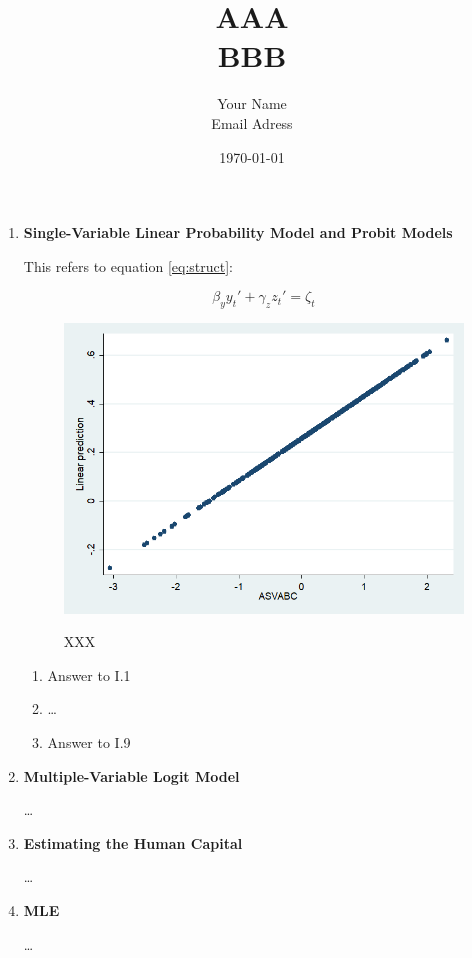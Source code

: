 \documentclass{article}
\title{AAA \\
    \normalsize BBB}
\date{\today}
\author{Your Name \\
        Email Adress}
\begin{document}
\maketitle

\begin{enumerate}[I]

\item \textbf{Single-Variable Linear Probability Model and Probit Models}

This refers to equation \ref{eq:struct}:

\begin{equation}\label{eq:struct}
    \beta_y y_t' + \gamma_z z_t' = \zeta_t
\end{equation}

%

\begin{figure}
    \centering
    \includegraphics[scale = 0.15]{graphs/linear.png}
    \label{XXX}\caption{XXX}
\end{figure}
\FloatBarrier

\begin{enumerate}[1.]
    \item Answer to I.1
    
    \item \dots
    
    \item Answer to I.9
\end{enumerate}

\item\textbf{Multiple-Variable Logit Model}

\dots

\item\textbf{Estimating the Human Capital}

\dots

\item\textbf{MLE}

\dots

\end{enumerate}
\end{document}
